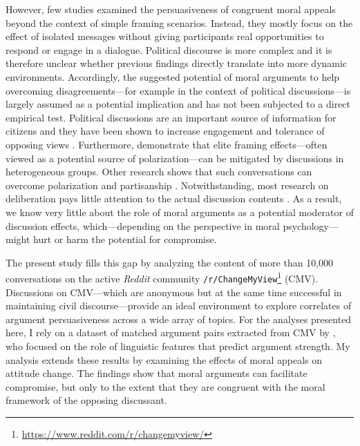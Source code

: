 However, few studies examined the persuasiveness of congruent moral appeals beyond the context of simple framing scenarios. Instead, they mostly focus on the effect of isolated messages without giving participants real opportunities to respond or engage in a dialogue. Political discourse is more complex and it is therefore unclear whether previous findings directly translate into more dynamic environments. Accordingly, the suggested potential of moral arguments to help overcoming disagreements---for example in the context of political discussions---is largely assumed as a potential implication and has not been subjected to a direct empirical test. Political discussions are an important source of information for citizens \citep{huckfeldt1995political} and they have been shown to increase engagement and tolerance of opposing views \citep{mutz2002cross}. Furthermore, \citet{druckman2003framing} demonstrate that elite framing effects---often viewed as a potential source of polarization---can be mitigated by discussions in heterogeneous groups. Other research shows that such conversations can overcome polarization and partisanship \citep{klar2014partisanship}. Notwithstanding, most research on deliberation pays little attention to the actual discussion contents \citep[see][for notable exceptions]{barabas2004deliberation,karpowitz2012gender,mendelberg2014gender}. As a result, we know very little about the role of moral arguments as a potential moderator of discussion effects, which---depending on the perspective in moral psychology---might hurt or harm the potential for compromise. 

The present study fills this gap by analyzing the content of more than 10,000 conversations on the active \textit{Reddit} community \texttt{/r/ChangeMyView}\footnote{\url{https://www.reddit.com/r/changemyview/}} (CMV). Discussions on CMV---which are anonymous but at the same time successful in maintaining civil discourse---provide an ideal environment to explore correlates of argument persuasiveness across a wide array of topics. For the analyses presented here, I rely on a dataset of matched argument pairs extracted from CMV by \citet{tan2016winning}, who focused on the role of linguistic features that predict argument strength. My analysis extends these results by examining the effects of moral appeals on attitude change. The findings show that moral arguments can facilitate compromise, but only to the extent that they are congruent with the moral framework of the opposing discussant.




